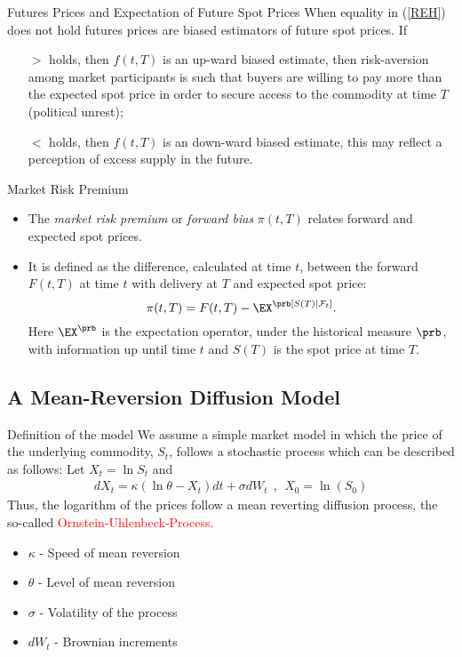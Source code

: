 {%
{Futures Prices and Expectation of Future Spot Prices}
When equality in (\ref{REH}) does not hold futures prices are biased estimators of
future spot prices. If
\begin{itemize}
\item[$>$] holds, then $f(t,T)$ is an up-ward biased estimate, then risk-aversion
among market participants is such that buyers are willing to pay more than the expected
spot price in order to secure access to the commodity at time $T$ (political unrest);
\item[$<$] holds, then $f(t,T)$ is an down-ward biased estimate, this may reflect a
perception of excess supply in the future.
\end{itemize}




{Market Risk Premium}
\begin{itemize}
\item<1-> The \emph{market risk premium} or \emph{forward bias} $\pi (t,T)$
relates forward and expected spot prices.
\item<2-> It is defined as the difference, calculated at time $t$, between
the forward $F(t,T)$ at time $t$ with delivery at $T$ and expected
spot price:
\begin{equation}\label{forward risk premium}
\pi(t,T)= F(t,T)-\EX^\prb[S(T)|\mathcal F_t].
\end{equation}
Here $\EX^\prb$ is the expectation operator, under the
historical measure $\prb$, with information up until time $t$ and
$S(T)$ is the spot price at time $T$.
\end{itemize}



\subsection[Mean-Reversion Model]{A Mean-Reversion Diffusion Model}



{Definition of the model}
We assume a simple market model in which the price of the underlying commodity, $S_t$, follows a stochastic process which can be described as follows:
Let $X_t = \ln S_t$ and
\begin{align*}
	dX_t = \kappa (\ln \theta - X_t)dt + \sigma dW_t~~,~~X_0 = \ln(S_0)
\end{align*}
Thus, the logarithm of the prices follow a mean reverting diffusion process, the so-called \textcolor{red}{Ornstein-Uhlenbeck-Process}.\\
\begin{itemize}
\item $\kappa$ - Speed of mean reversion
\item $\theta$ - Level of mean reversion
\item $\sigma$ - Volatility of the process
\item $dW_t$ - Brownian increments
\end{itemize}



}
